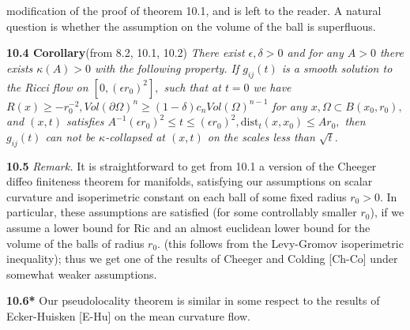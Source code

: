 \documentclass[12pt]{article}
\newcommand{\e}{\epsilon}
\newcommand{\de}{\delta}
\theoremstyle{plain}
{\swapnumbers
\newtheorem{thm}{Theorem}[section]
\newtheorem{cor}[thm]{Corollary}
\newtheorem{lem}[thm]{Lemma}
\newtheorem{prop}[thm]{Proposition}
}
\theoremstyle{definition}
{\swapnumbers
\newtheorem{defn}[thm]{Definition}
\newtheorem{nota}[thm]{Notation}
\newtheorem{parag}[thm]{}
\newtheorem*{parstr}{\addtocounter{thm}{1}\thesection.\arabic{thm}*}
\newtheorem*{intropar}{\addtocounter{thm}{1}\arabic{thm}}
}
\theoremstyle{remark} {\swapnumbers
\newtheorem{rem}[thm]{Remark}
\newtheorem{exam}[thm]{Example}
\newtheorem{lemma}[thm]{Lemma}
\newtheorem{claim}[thm]{Claim}
}
\numberwithin{equation}{section}
\begin{document}
 modification of the proof of theorem 10.1, and is left to the
 reader. A natural question is whether the assumption on the
 volume of the ball is superfluous. \par {\bf 10.4 Corollary}(from 8.2,
 10.1, 10.2) {\it  There exist $\e,\de > 0$ and for any $A>0$ there
 exists $\kappa(A)>0$ with the following property. If $g_{ij}(t)$
 is a smooth solution to the Ricci flow on $[0,(\e r_0)^2],$ such
 that
 at $t=0$ we have $R(x)\ge -r_0^{-2}, Vol(\partial\Omega)^n\ge
 (1-\de)c_nVol(\Omega)^{n-1}$  for any
 $x,\Omega\subset B(x_0,r_0),$ and $(x,t)$ satisfies $A^{-1}(\e
 r_0)^2\le t\le (\e r_0)^2, \mbox{dist}_t(x,x_0)\le Ar_0,$ then
 $g_{ij}(t)$ can not be $\kappa$-collapsed at $(x,t)$ on the
 scales less than $\sqrt{t}.$} \par {\bf 10.5} {\it Remark.} It is
 straightforward to get from 10.1 a version of the Cheeger diffeo
 finiteness theorem for manifolds, satisfying our assumptions on
 scalar curvature and isoperimetric constant on each ball of some
 fixed radius $r_0>0.$ In particular, these assumptions are
 satisfied (for some controllably smaller $r_0$), if we assume a
 lower bound for $\mbox{Ric}$ and an almost euclidean lower bound
 for the volume of the balls of radius $r_0.$ (this follows from
 the
 Levy-Gromov isoperimetric inequality); thus we get one of the
 results of Cheeger and Colding [Ch-Co] under somewhat weaker
 assumptions. \par {\bf 10.6*} Our pseudolocality theorem is similar in
 some respect to the results of Ecker-Huisken [E-Hu] on the mean
 curvature flow.
\end{document}
